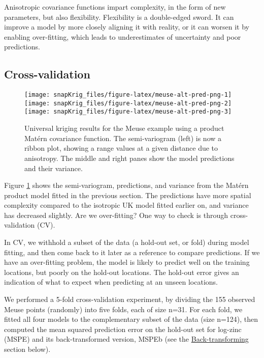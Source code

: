Anisotropic covariance functions impart complexity, in the form of new parameters, but also flexibility. Flexibility is a double-edged sword. It can improve a model by more closely aligning it with reality, or it can worsen it by enabling over-fitting, which leads to underestimates of uncertainty and poor predictions.

\hypertarget{cross-validation}{%
\subsection{Cross-validation}\label{cross-validation}}

\begin{figure}[!bht]
\texttt{[image: snapKrig\_files/figure-latex/meuse-alt-pred-png-1]} \texttt{[image: snapKrig\_files/figure-latex/meuse-alt-pred-png-2]} \texttt{[image: snapKrig\_files/figure-latex/meuse-alt-pred-png-3]} \caption{Universal kriging results for the Meuse example using a product Matérn covariance function. The semi-variogram (left) is now a ribbon plot, showing a range values at a given distance due to anisotropy. The middle and right panes show the model predictions and their variance.}\label{fig:meuse-alt-pred-png}
\end{figure}

Figure \ref{fig:meuse-alt-pred-png} shows the semi-variogram, predictions, and variance from the Matérn product model fitted in the previous section. The predictions have more spatial complexity compared to the isotropic UK model fitted earlier on, and variance has decreased slightly. Are we over-fitting? One way to check is through cross-validation (CV).

In CV, we withhold a subset of the data (a hold-out set, or fold) during model fitting, and then come back to it later as a reference to compare predictions. If we have an over-fitting problem, the model is likely to predict well on the training locations, but poorly on the hold-out locations. The hold-out error gives an indication of what to expect when predicting at an unseen locations.

We performed a 5-fold cross-validation experiment, by dividing the 155 observed Meuse points (randomly) into five folds, each of size n=31. For each fold, we fitted all four models to the complementary subset of the data (size n=124), then computed the mean squared prediction error on the hold-out set for log-zinc (MSPE) and its back-transformed version, MSPEb (see the \protect\hyperlink{back-transforming}{Back-transforming} section below).


